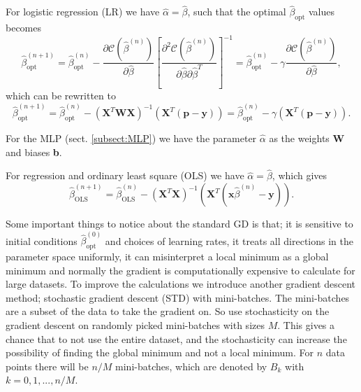 \documentclass[12pt,a4paper,english]{article}
\begin{document}
For logistic regression (LR) we have $\hat{\alpha}=\hat{\beta}$, such that the optimal $\hat{\beta}_{\text{opt}}$ values becomes
\begin{equation*}
\label{eq:GD}
\hat{\beta}_{\text{opt}}^{(n+1)}=\hat{\beta}_{\text{opt}}^{(n)}-\frac{\partial \mathcal{C}(\hat{\beta}^{(n)})}{\partial \hat{\beta}}\left[\frac{\partial^2 \mathcal{C}(\hat{\beta}^{(n)})}{\partial \hat{\beta}\partial \hat{\beta}^T}\right]^{-1}=\hat{\beta}^{(n)}_{\text{opt}}-\gamma\frac{\partial \mathcal{C}(\hat{\beta}^{(n)})}{\partial \hat{\beta}},
\end{equation*}
which can be rewritten to
\begin{equation}
\label{eq:GD_LR}
\hat{\beta}_{\text{opt}}^{(n+1)}=\hat{\beta}_{\text{opt}}^{(n)}-(\textbf{X}^T\textbf{W}\textbf{X})^{-1}(\textbf{X}^T(\textbf{p}-\textbf{y}))=\hat{\beta}_{\text{opt}}^{(n)}-\gamma(\textbf{X}^T(\textbf{p}-\textbf{y})).
\end{equation}

For the MLP (sect. \ref{subsect:MLP}) we have the parameter $\hat{\alpha}$ as the weights \textbf{W} and biases \textbf{b}.

For regression and ordinary least square (OLS) we have $\hat{\alpha}=\hat{\beta}$, which gives
\begin{equation}
\label{eq:GD_OLS}
\hat{\beta}_{\text{OLS}}^{(n+1)}=\hat{\beta}_{\text{OLS}}^{(n)}-(\textbf{X}^T\textbf{X})^{-1}(\textbf{X}^T(\textbf{x}\hat{\beta}^{(n)}-\textbf{y})).
\end{equation}

Some important things to notice about the standard GD is that; it is sensitive to initial conditions $\hat{\beta}^{(0)}_{\text{opt}}$ and choices of learning rates, it treats all directions in the parameter space uniformly, it can misinterpret a local minimum as a global minimum and normally the gradient is computationally expensive to calculate for large datasets. To improve the calculations we introduce another gradient descent method; stochastic gradient descent (STD) with mini-batches. The mini-batches are a subset of the data to take the gradient on. So use stochasticity on the gradient descent on randomly picked mini-batches with sizes $M$. This gives a chance that to not use the entire dataset, and the stochasticity can increase the possibility of finding the global minimum and not a local minimum. For $n$ data points there will be $n/M$ mini-batches, which are denoted by $B_k$ with $k=0,1,...,n/M$.
\end{document}
